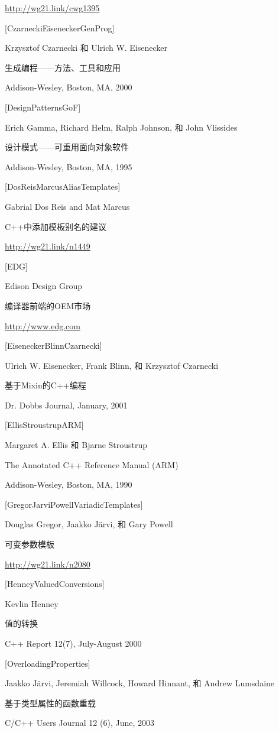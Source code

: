 \url{http://wg21.link/cwg1395}

{[CzarneckiEiseneckerGenProg]}

Krzysztof Czarnecki 和 Ulrich W. Eisenecker

生成编程——方法、工具和应用

Addison-Wesley, Boston, MA, 2000

{[DesignPatternsGoF]}

Erich Gamma, Richard Helm, Ralph Johnson, 和 John Vlissides

设计模式——可重用面向对象软件

Addison-Wesley, Boston, MA, 1995

{[DosReisMarcusAliasTemplates]}

Gabrial Dos Reis and Mat Marcus

C++中添加模板别名的建议

\url{http://wg21.link/n1449}

{[EDG]}

Edison Design Group

编译器前端的OEM市场

\url{http://www.edg.com}

{[EiseneckerBlinnCzarnecki]}

Ulrich W. Eisenecker, Frank Blinn, 和 Krzysztof Czarnecki

基于Mixin的C++编程

Dr. Dobbs Journal, January, 2001

{[EllisStroustrupARM]}

Margaret A. Ellis 和 Bjarne Stroustrup

The Annotated C++ Reference Manual (ARM)

Addison-Wesley, Boston, MA, 1990

{[GregorJarviPowellVariadicTemplates]}

Douglas Gregor, Jaakko J{\"a}rvi, 和 Gary Powell 

可变参数模板

\url{http://wg21.link/n2080}

{[HenneyValuedConversions]}

Kevlin Henney

值的转换

C++ Report 12(7), July-August 2000

{[OverloadingProperties]}

Jaakko J{\"a}rvi, Jeremiah Willcock, Howard Hinnant, 和 Andrew Lumsdaine

基于类型属性的函数重载

C/C++ Users Journal 12 (6), June, 2003

